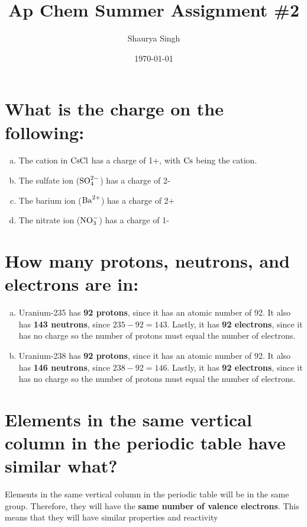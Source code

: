 \documentclass[11pt]{article}
\author{Shaurya Singh}
\date{\today}
\title{Ap Chem Summer Assignment \#2}
\begin{document}
\maketitle

\section{What is the charge on the following:}
\label{sec:org7699593}
\begin{enumerate}[(a)]
\item The cation in \(\ce{CsCl}\) has a charge of 1+, with \(\ce{Cs}\) being the cation.
\item The sulfate ion (\(\ce{SO^{2-}4}\)) has a charge of 2-
\item The barium ion (\(\ce{Ba^{2+}}\)) has a charge of 2+
\item The nitrate ion (\(\ce{NO^-3}\)) has a charge of 1-
\end{enumerate}

\section{How many protons, neutrons, and electrons are in:}
\label{sec:org327104a}
\begin{enumerate}[(a)]
\item Uranium-235 has \textbf{92 protons}, since it has an atomic number of 92. It also has \textbf{143 neutrons}, since \(235-92=143\). Lastly, it has \textbf{92 electrons}, since it has no charge so the number of protons must equal the number of electrons.
\item Uranium-238 has \textbf{92 protons}, since it has an atomic number of 92. It also has \textbf{146 neutrons}, since \(238-92=146\). Lastly, it has \textbf{92 electrons}, since it has no charge so the number of protons must equal the number of electrons.
\end{enumerate}

\section{Elements in the same vertical column in the periodic table have similar what?}
\label{sec:org584f344}
Elements in the same vertical column in the periodic table will be in the same
group. Therefore, they will have the \textbf{same number of valence electrons}. This
means that they will have similar properties and reactivity
\end{document}
